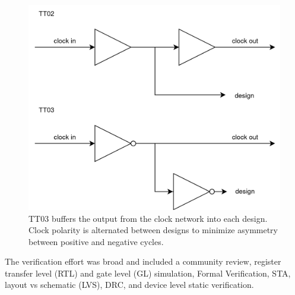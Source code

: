 \begin{figure}[htp]
\centering
\includegraphics[width=\columnwidth]{./Figs/tt02 vs tt03 scanchain clock.png}
\caption{TT03 buffers the output from the clock network into each design. Clock polarity is alternated between designs to minimize asymmetry between positive and negative cycles.}
\label{fig:TT02_vs_TT03}
\end{figure}


The verification effort\cite{verificationmd} was broad and included a community review, register transfer level (RTL) and gate level (GL) simulation, Formal Verification\cite{sby}, STA, layout vs schematic (LVS), DRC, and device level static verification\cite{cvc}.

